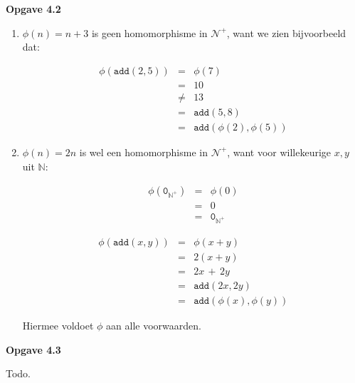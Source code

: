 \documentclass[a4paper,11pt]{article}
\begin{document}
{\bf Opgave 4.2}

\begin{enumerate}

\item %

  $\phi(n) = n+3$ is geen homomorphisme in $\mathcal{N}^{+}$, want we zien
  bijvoorbeeld dat:

  \begin{eqnarray*}
    \phi(\texttt{add}(2,5)) & = & \phi(7) \\
                          & = & 10 \\
                          & \ne & 13 \\
                          & = & \texttt{add}(5,8) \\
                          & = & \texttt{add}(\phi(2),\phi(5))
  \end{eqnarray*}

\item %

  $\phi(n) = 2n$ is wel een homomorphisme in $\mathcal{N}^{+}$, want voor
  willekeurige $x,y$ uit $\mathbb{N}$:

  \begin{eqnarray*}
    \phi(\texttt{0}_{\mathbb{N}^{+}}) & = & \phi(0) \\
                                    & = & 0 \\
                                    & = & \texttt{0}_{\mathbb{N}^{+}}
  \end{eqnarray*}

  \begin{eqnarray*}
    \phi(\texttt{add}(x,y)) & = & \phi(x+y) \\
                          & = & 2(x+y) \\
                          & = & 2x \, + \, 2y \\
                          & = & \texttt{add}(2x, 2y) \\
                          & = & \texttt{add}(\phi(x), \phi(y))
  \end{eqnarray*}

  Hiermee voldoet $\phi$ aan alle voorwaarden.\\[2em]

\end{enumerate}


{\bf Opgave 4.3}

Todo.\\[2em]
\end{document}
